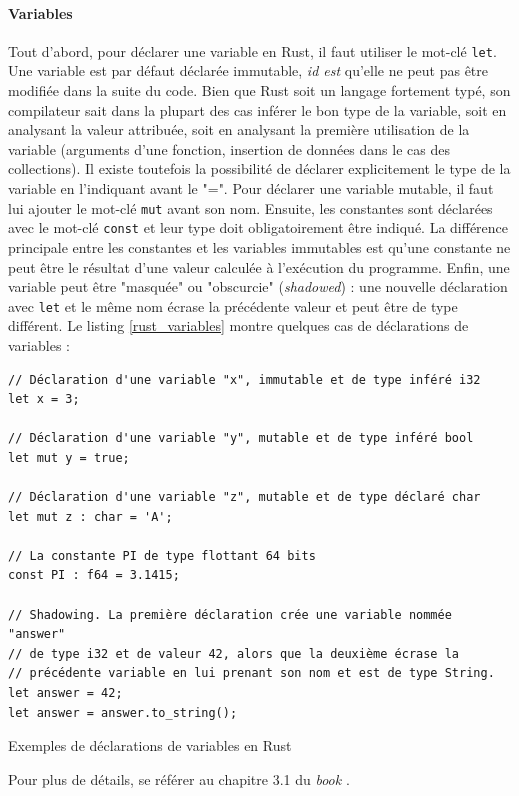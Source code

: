 \documentclass[a4paper, 12pt]{article}
\newenvironment{code}{\captionsetup{type=listing}}{}
\begin{document}
\paragraph{Variables}
Tout d'abord, pour déclarer une variable en Rust, il faut utiliser le mot-clé \texttt{let}. Une variable 
est par défaut déclarée immutable, \textit{id est} qu'elle ne peut pas être modifiée dans la suite du 
code. Bien que Rust soit un langage fortement typé, son compilateur sait dans la plupart des cas 
inférer le bon type de la variable, soit en analysant la valeur attribuée, soit en analysant la 
première utilisation de la variable (arguments d'une fonction, insertion de données dans le cas 
des collections). Il existe toutefois la possibilité de déclarer explicitement le type de la variable 
en l'indiquant avant le "=". Pour déclarer une variable mutable, il faut lui ajouter le mot-clé 
\texttt{mut} avant son nom. Ensuite, les constantes sont déclarées avec le mot-clé \texttt{const} 
et leur type doit obligatoirement être indiqué. La différence principale entre les constantes et 
les variables immutables est qu'une constante ne peut être le résultat d'une valeur calculée à 
l'exécution du programme. Enfin, une variable peut être "masquée" ou "obscurcie" (\textit{shadowed}) : 
une nouvelle déclaration avec \texttt{let} et le même nom écrase la précédente valeur et 
peut être de type différent. Le listing \ref{rust_variables} montre quelques cas de déclarations de variables :
\bigbreak
\begin{code}
    \begin{verbatim}
// Déclaration d'une variable "x", immutable et de type inféré i32
let x = 3;

// Déclaration d'une variable "y", mutable et de type inféré bool
let mut y = true;

// Déclaration d'une variable "z", mutable et de type déclaré char
let mut z : char = 'A';

// La constante PI de type flottant 64 bits
const PI : f64 = 3.1415;

// Shadowing. La première déclaration crée une variable nommée "answer"
// de type i32 et de valeur 42, alors que la deuxième écrase la 
// précédente variable en lui prenant son nom et est de type String.
let answer = 42;
let answer = answer.to_string();
    \end{verbatim}
    \caption{Exemples de déclarations de variables en Rust}
    \label{rust_variables}
\end{code}
\bigbreak
Pour plus de détails, se référer au chapitre 3.1 du \textit{book} \cite{ref0}.
\end{document}
